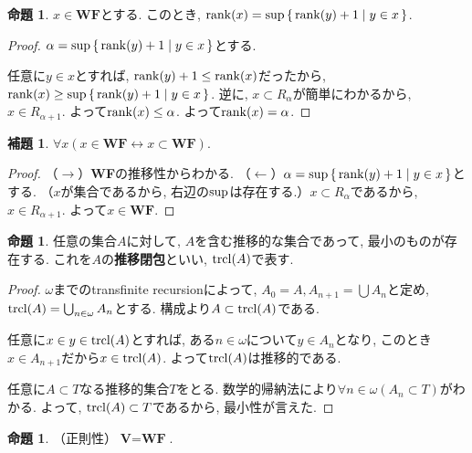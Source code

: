 \documentclass[a4paper, twoside]{bxjsarticle}
\theoremstyle{definition}
\newtheorem{prop}[thm]{命題}
\newtheorem{lem}[thm]{補題}
\begin{document}
         \begin{prop}
            $x\in \textbf{WF}$とする. このとき, ${\rm rank}(x)={\rm sup}\set{{\rm rank}(y)+1|y\in x}$.
         \end{prop}
         \begin{proof}
            $\alpha ={\rm sup}\set{{\rm rank}(y)+1|y\in x}$とする.
            
            任意に$y\in x$とすれば, ${\rm rank}(y)+1\leq{\rm rank}(x)$だったから, ${\rm rank}(x)\geq{\rm sup}\set{{\rm rank}(y)+1|y\in x}$. 逆に, $x\subset R_\alpha$が簡単にわかるから, $x\in R_{\alpha+1}$. よって${\rm rank}(x)\leq \alpha$. よって${\rm rank}(x)=\alpha$.
         \end{proof}
         \begin{lem}\label{wflem}
            $\forall x(x\in \textbf{WF}\leftrightarrow x\subset \textbf{WF})$.
         \end{lem}
         \begin{proof}
            （$\rightarrow$）\textbf{WF}の推移性からわかる.
            （$\leftarrow$）$\alpha = {\rm sup}\set{{\rm rank}(y)+1|y\in x}$とする. （$x$が集合であるから, 右辺の${\rm sup}$は存在する.）$x\subset R_\alpha$であるから, $x\in R_{\alpha+1}$. よって$x\in \textbf{WF}$.
         \end{proof}
         \begin{prop}
            任意の集合$A$に対して, $A$を含む推移的な集合であって, 最小のものが存在する. これを$A$の\textbf{推移閉包}といい, ${\rm trcl}(A)$で表す.
         \end{prop}
         \begin{proof}
            $\omega$までのtransfinite recursionによって, $A_0 = A, A_{n+1}=\bigcup A_n$と定め, ${\rm trcl}(A)=\bigcup_{n\in \omega}A_n$とする. 構成より$A\subset {\rm trcl}(A)$である. 
            
            任意に$x\in y\in {\rm trcl}(A)$とすれば, ある$n\in\omega$について$y\in A_n$となり, このとき$x\in A_{n+1}$だから$x\in {\rm trcl}(A)$. よって${\rm trcl}(A)$は推移的である. 
            
            任意に$A \subset T$なる推移的集合$T$をとる. 数学的帰納法により$\forall n\in\omega(A_n\subset T)$がわかる. よって, ${\rm trcl}(A)\subset T$であるから, 最小性が言えた.
         \end{proof}
         \begin{prop}
            （正則性）$\textbf{V}=\textbf{WF}$.
         \end{prop}
\end{document}
